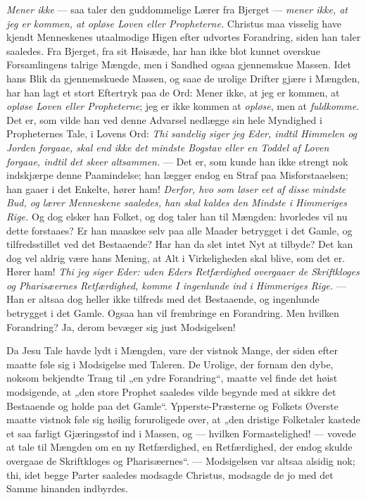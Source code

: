 \documentclass[12pt,a4paper]{book}
\begin{document}
\emph{Mener ikke} --- saa taler den guddommelige Lærer fra Bjerget --- \emph{mener
ikke, at jeg er kommen, at opløse Loven eller Propheterne.} Christus maa visselig have
kjendt Menneskenes utaalmodige Higen efter udvortes Forandring, siden han taler
saaledes. Fra Bjerget, fra sit Høisæde, har han ikke blot kunnet overskue Forsamlingens
talrige Mængde, men i Sandhed ogsaa gjennemskue Massen. Idet hans Blik da gjennemskuede
Massen, og saae de urolige Drifter gjære i Mængden, har han lagt et stort Eftertryk paa
de Ord: Mener ikke, at jeg er kommen, at \emph{opløse Loven eller Propheterne}; jeg er
ikke kommen at \emph{opløse}, men at \emph{fuldkomme}. Det er, som vilde han ved denne
Advarsel nedlægge sin hele Myndighed i Propheternes Tale, i Lovens Ord: \emph{Thi
sandelig siger jeg Eder, indtil Himmelen og Jorden forgaae, skal end ikke det mindste
Bogstav eller en Toddel af Loven forgaae, indtil det skeer altsammen.} --- Det er, som
kunde han ikke strengt nok indskjærpe denne Paamindelse; han lægger endog en Straf paa
Misforstaaelsen; han gaaer i det
Enkelte, hører ham! \emph{Derfor, hvo som løser eet af disse mindste Bud, og lærer
Menneskene saaledes, han skal kaldes den Mindste i Himmeriges Rige.} Og dog elsker han
Folket, og dog taler han til Mængden: hvorledes vil nu dette forstaaes? Er han maaskee
selv paa alle Maader betrygget i det Gamle, og tilfredsstillet ved det Bestaaende? Har
han da slet intet Nyt at tilbyde? Det kan dog vel aldrig være hans Mening, at Alt i
Virkeligheden skal blive, som det er. Hører ham! \emph{Thi jeg siger Eder: uden Eders
Retfærdighed overgaaer de Skriftkloges og Pharisæernes Retfærdighed, komme I ingenlunde
ind i Himmeriges Rige.} --- Han er altsaa dog heller ikke tilfreds med det Bestaaende,
og ingenlunde betrygget i det Gamle. Ogsaa han vil frembringe en Forandring. Men
hvilken Forandring? Ja, derom bevæger sig just Modsigelsen!

Da Jesu Tale havde lydt i Mængden, vare der vistnok Mange, der siden efter maatte føle
sig i Modsigelse med Taleren. De Urolige, der fornam den dybe, noksom bekjendte Trang
til „en ydre Forandring“, maatte vel finde det høist modsigende, at „den store Prophet
saaledes vilde begynde med at sikkre det Bestaaende og holde paa det Gamle“.
Ypperste-Præsterne og Folkets Øverste maatte vistnok føle sig høilig foruroligede over,
at „den dristige Folketaler kastede et saa farligt Gjæringsstof ind i Massen, og ---
hvilken Formastelighed! --- vovede at tale til Mængden om en ny Retfærdighed, en
Retfærdighed, der endog skulde overgaae de Skriftkloges og Pharisæernes“. ---
Modsigelsen var altsaa alsidig nok; thi, idet begge Parter saaledes modsagde Christus,
modsagde de jo med det Samme hinanden indbyrdes.
\end{document}
